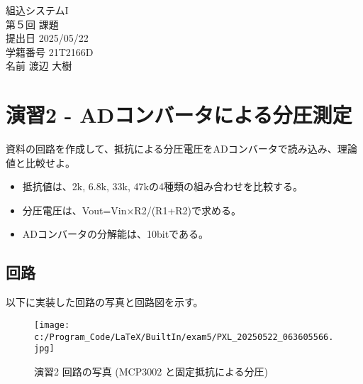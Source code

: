 \documentclass[a4paper,11pt,dvipdfmx]{jsarticle}
\begin{document}
\begin{titlepage}
\noindent
\vspace{4cm}
\begin{center}
\begin{LARGE}
組込システムI \\
第５回  課題 \\
\vspace{8cm}
提出日  2025/05/22 \\
学籍番号  21T2166D \\
名前  渡辺 大樹 \\
\end{LARGE}
\end{center}
\end{titlepage}


\section{演習2 - ADコンバータによる分圧測定}
\begin{shaded}
    \noindent
    資料の回路を作成して、抵抗による分圧電圧をADコンバータで読み込み、理論値と比較せよ。
    \begin{itemize}
        \item 抵抗値は、2k, 6.8k, 33k, 47kの4種類の組み合わせを比較する。
        \item 分圧電圧は、Vout=Vin×R2/(R1+R2)で求める。
        \item ADコンバータの分解能は、10bitである。
    \end{itemize}
\end{shaded}

\subsection{回路}
以下に実装した回路の写真と回路図を示す。
\begin{figure}[h]
    \centering
    \texttt{[image: c:/Program\_Code/LaTeX/BuiltIn/exam5/PXL\_20250522\_063605566.jpg]}
    \caption{演習2 回路の写真 (MCP3002 と固定抵抗による分圧)}
    \label{fig:exam2-photo}
\end{figure}
\end{document}
